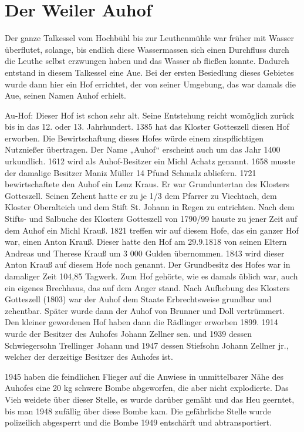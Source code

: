 \documentclass{book}
\begin{document}
\section{Der Weiler Auhof}

Der ganze Talkessel vom Hochbühl bis zur Leuthenmühle war früher mit Wasser
überflutet, solange, bis endlich diese Wassermassen sich einen Durchfluss durch
die Leuthe selbst erzwungen haben und das Wasser ab fließen konnte. Dadurch
entstand in diesem Talkessel eine Aue. Bei der ersten Besiedlung dieses Gebietes
wurde dann hier ein Hof errichtet, der von seiner Umgebung, das war damals die
Aue, seinen Namen Auhof erhielt.

Au-Hof: Dieser Hof ist schon sehr alt. Seine Entstehung reicht womöglich zurück
bis in das 12. oder 13. Jahrhundert. 1385 hat das Kloster Gotteszell diesen Hof
erworben. Die Bewirtschaftung dieses Hofes würde einem zinspflichtigen
Nutznießer übertragen. Der Name „Auhof“ erscheint auch um das Jahr 1400
urkundlich. 1612 wird als Auhof-Besitzer ein Michl Achatz genannt. 1658 musste
der damalige Besitzer Maniz Müller 14 Pfund Schmalz abliefern. 1721
bewirtschaftete den Auhof ein Lenz Kraus. Er war Grunduntertan des Klosters
Gotteszell. Seinen Zehent hatte er zu je 1/3 dem Pfarrer zu Viechtach, dem
Kloster Oberalteich und dem Stift St. Johann in Regen zu entrichten. Nach dem
Stifts- und Salbuche des Klosters Gotteszell von 1790/99 hauste zu jener Zeit
auf dem Auhof ein Michl Krauß. 1821 treffen wir auf diesem Hofe, das ein ganzer
Hof war, einen Anton Krauß. Dieser hatte den Hof am 29.9.1818 von seinen Eltern
Andreas und Therese Krauß um 3 000 Gulden übernommen. 1843 wird dieser Anton
Krauß auf diesem Hofe noch genannt. Der Grundbesitz des Hofes war in damaliger
Zeit 104,85 Tagwerk. Zum Hof gehörte, wie es damals üblich war, auch ein eigenes
Brechhaus, das auf dem Anger stand. Nach Aufhebung des Klosters Gotteszell
(1803) war der Auhof dem Staate Erbrechtsweise grundbar und zehentbar. Später
wurde dann der Auhof von Brunner und Doll vertrümmert. Den kleiner gewordenen
Hof haben dann die Rädlinger erworben 1899. 1914 wurde der Besitzer des Auhofes
Johann Zellner sen. und 1939 dessen Schwiegersohn Trellinger Johann und 1947
dessen Stiefsohn Johann Zellner jr., welcher der derzeitige Besitzer des Auhofes
ist.

1945 haben die feindlichen Flieger auf die Anwiese in unmittelbarer Nähe des
Auhofes eine 20 kg schwere Bombe abgeworfen, die aber nicht explodierte. Das
Vieh weidete über dieser Stelle, es wurde darüber gemäht und das Heu geerntet,
bis man 1948 zufällig über diese Bombe kam. Die gefährliche Stelle wurde
polizeilich abgesperrt und die Bombe 1949 entschärft und abtransportiert.
\end{document}
